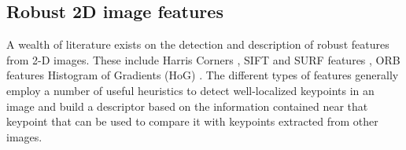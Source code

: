 %
%
%


\subsection{Robust 2D image features}
\label{sec.2Dfeatures}

A wealth of literature exists on the detection and description of robust features from 2-D images. These include Harris Corners \cite{Harris1988}, SIFT and SURF features \cite{Lowe2004} \cite{Bay2006}, ORB features \cite{Rublee2011} Histogram of Gradients (HoG) \cite{Dalal2005}. The different types of features generally employ a number of useful heuristics to detect well-localized keypoints in an image and build a descriptor based on the information contained near that keypoint that can be used to compare it with keypoints extracted from other images. 

